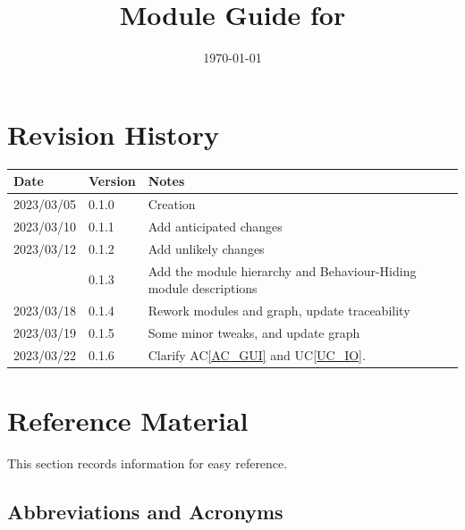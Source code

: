 \documentclass[12pt, titlepage]{article}
\newcommand{\acref}[1]{AC\ref{#1}}
\newcommand{\uref}[1]{UC\ref{#1}}
\begin{document}
\title{Module Guide for \progname{}} 
\author{\authname}
\date{\today}

\maketitle


\section{Revision History}

\begin{tabularx}{\textwidth}{p{3cm}p{2cm}X}
\toprule {\bf Date} & {\bf Version} & {\bf Notes}\\
\midrule
2023/03/05 & 0.1.0 & Creation\\
2023/03/10 & 0.1.1 & Add anticipated changes\\
2023/03/12 & 0.1.2 & Add unlikely changes\\
           & 0.1.3 & Add the module hierarchy and Behaviour-Hiding module descriptions\\
2023/03/18 & 0.1.4 & Rework modules and graph, update traceability\\
2023/03/19 & 0.1.5 & Some minor tweaks, and update graph\\
2023/03/22 & 0.1.6 & Clarify \acref{AC_GUI} and \uref{UC_IO}.\\
\bottomrule
\end{tabularx}

\newpage

\section{Reference Material}

This section records information for easy reference.

\subsection{Abbreviations and Acronyms}
\end{document}
